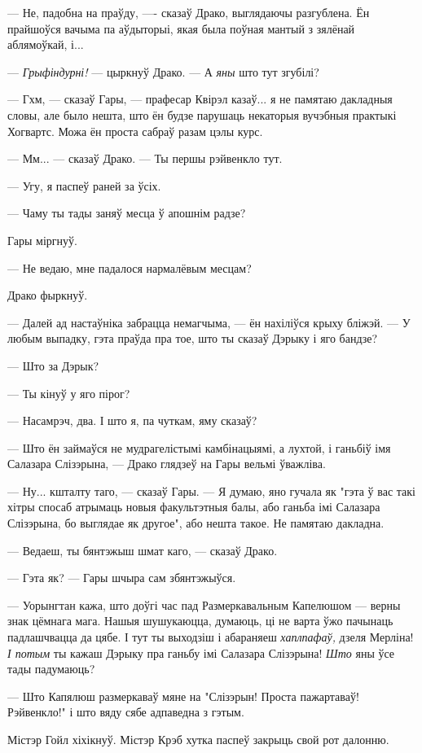 --- Не, падобна на праўду, ---- сказаў Драко, выглядаючы разгублена. Ён прайшоўся
вачыма па аўдыторыі, якая была поўная мантый з зялёнай аблямоўкай, і...

--- \emph{Грыфіндурні!} --- цыркнуў Драко. --- А  \emph{яны} што тут згубілі?

--- Гхм, --- сказаў Гары, --- прафесар Квірэл казаў... я не памятаю дакладныя словы,
але было нешта, што ён будзе парушаць некаторыя вучэбныя практыкі Хогвартс. 
Можа ён проста сабраў разам цэлы курс.

--- Мм... --- сказаў Драко. --- Ты першы рэйвенкло тут.

--- Угу, я паспеў раней за ўсіх.

--- Чаму ты тады заняў месца ў апошнім радзе?

Гары міргнуў.

--- Не ведаю, мне падалося нармалёвым месцам?

Драко фыркнуў.

--- Далей ад настаўніка забрацца немагчыма, --- ён нахіліўся крыху бліжэй. ---
У любым выпадку, гэта праўда пра тое, што ты сказаў Дэрыку і яго бандзе?

--- Што за Дэрык?

--- Ты кінуў у яго пірог?

--- Насамрэч, два. І што я, па чуткам, яму сказаў?

--- Што ён займаўся не мудрагелістымі камбінацыямі, а лухтой, і ганьбіў імя Салазара Слізэрына, --- 
Драко глядзеў на Гары вельмі ўважліва.

--- Ну... кшталту таго, --- сказаў Гары. --- Я думаю, яно гучала як "гэта ў вас такі
хітры спосаб атрымаць новыя факультэтныя балы, або  
ганьба імі Салазара Слізэрына, бо выглядае як другое", або нешта такое. Не памятаю 
дакладна.

--- Ведаеш, ты бянтэжыш шмат каго, --- сказаў Драко.

--- Гэта як? --- Гары шчыра сам збянтэжыўся.

--- Уорынгтан кажа, што доўгі час пад Размеркавальным Капелюшом --- верны знак 
цёмнага мага. Нашыя шушукаюцца, думаюць, ці не варта ўжо пачынаць падлашчвацца да цябе.
І тут ты выходзіш і абараняеш \emph{хаплпафаў,} дзеля Мерліна! \emph{І потым} 
ты кажаш Дэрыку пра ганьбу імі Салазара Слізэрына! \emph{Што} яны ўсе тады падумаюць? 

--- Што Капялюш размеркаваў мяне на "Слізэрын! Проста пажартаваў! Рэйвенкло!" 
і што вяду сябе адпаведна з гэтым.

Містэр Гойл хіхікнуў. Містэр Крэб хутка паспеў закрыць свой рот далонню.

